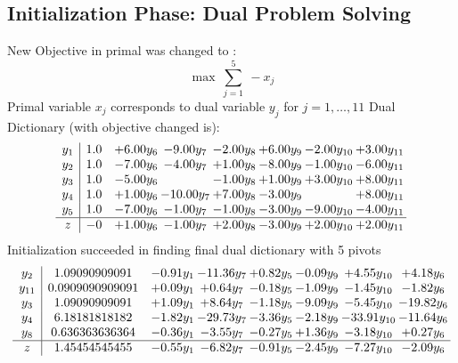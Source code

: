 \documentclass[8pt]{article}
\begin{document}
\subsection{Initialization Phase: Dual Problem Solving}
New Objective in primal was changed to : \[ \max\ \sum_{j=1}^{5}\ - x_j \] 
Primal variable $x_j$ corresponds to dual variable $y_j$ for $j = 1,\ldots,11$
Dual Dictionary (with objective changed is): 
\[\begin{array}{c| c c@{\hskip 2pt} c@{\hskip 2pt} c@{\hskip 2pt} c@{\hskip 2pt} c@{\hskip 2pt} c@{\hskip 2pt} }
 y_{1}   &  1.0 & +  6.00 y_{6} & -9.00 y_{7} & -2.00 y_{8} & +  6.00 y_{9} & -2.00 y_{10} & +  3.00 y_{11}\\
 y_{2}   &  1.0 & -7.00 y_{6} & -4.00 y_{7} & +  1.00 y_{8} & -8.00 y_{9} & -1.00 y_{10} & -6.00 y_{11}\\
 y_{3}   &  1.0 & -5.00 y_{6} &   & -1.00 y_{8} & +  1.00 y_{9} & +  3.00 y_{10} & +  8.00 y_{11}\\
 y_{4}   &  1.0 & +  1.00 y_{6} & -10.00 y_{7} & +  7.00 y_{8} & -3.00 y_{9} &   & +  8.00 y_{11}\\
 y_{5}   &  1.0 & -7.00 y_{6} & -1.00 y_{7} & -1.00 y_{8} & -3.00 y_{9} & -9.00 y_{10} & -4.00 y_{11}\\
\hline
z    &  -0 & +  1.00 y_{6} & -1.00 y_{7} & +  2.00 y_{8} & -3.00 y_{9} & +  2.00 y_{10} & +  2.00 y_{11}\\
\end{array}\]
Initialization succeeded in finding final dual dictionary with 5 pivots
\[\begin{array}{c| c c@{\hskip 2pt} c@{\hskip 2pt} c@{\hskip 2pt} c@{\hskip 2pt} c@{\hskip 2pt} c@{\hskip 2pt} }
 y_{2}   &  1.09090909091 & -0.91 y_{1} & -11.36 y_{7} & +  0.82 y_{5} & -0.09 y_{9} & +  4.55 y_{10} & +  4.18 y_{6}\\
 y_{11}   &  0.0909090909091 & +  0.09 y_{1} & +  0.64 y_{7} & -0.18 y_{5} & -1.09 y_{9} & -1.45 y_{10} & -1.82 y_{6}\\
 y_{3}   &  1.09090909091 & +  1.09 y_{1} & +  8.64 y_{7} & -1.18 y_{5} & -9.09 y_{9} & -5.45 y_{10} & -19.82 y_{6}\\
 y_{4}   &  6.18181818182 & -1.82 y_{1} & -29.73 y_{7} & -3.36 y_{5} & -2.18 y_{9} & -33.91 y_{10} & -11.64 y_{6}\\
 y_{8}   &  0.636363636364 & -0.36 y_{1} & -3.55 y_{7} & -0.27 y_{5} & +  1.36 y_{9} & -3.18 y_{10} & +  0.27 y_{6}\\
\hline
z    &  1.45454545455 & -0.55 y_{1} & -6.82 y_{7} & -0.91 y_{5} & -2.45 y_{9} & -7.27 y_{10} & -2.09 y_{6}\\
\end{array}\]
\end{document}
